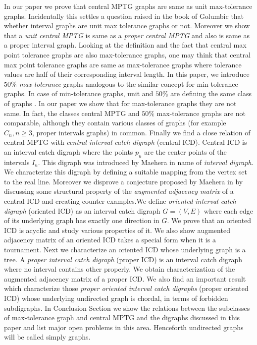 \documentclass{article}
\theoremstyle{definition}
\numberwithin{equation}{section}
\begin{document}
\vspace{0.5em}
\noindent In our paper we prove that central MPTG graphs are same as unit max-tolerance graphs. Incidentally this settles a question raised in the book of Golumbic \cite{Golumbic2} that whether interval graphs are unit max tolerance graphs or not. Moreover we show that a {\em unit central MPTG} is same as a {\em proper central MPTG} and also is same as a proper interval graph. Looking at the definition and the fact that central max point tolerance graphs are also max-tolerance graphs, one may think that central max point tolerance graphs are same as max-tolerance graphs where tolerance values are half of their corresponding interval length. In this paper, we introduce {\em $50\%$ max-tolerance} graphs analogous to the  similar concept for min-tolerance graphs. In case of min-tolerance graphs, unit and $50\%$ are defining the same class of graphs \cite{Bogart}. In our paper we show that for max-tolerance graphs they are not same. In fact, the classes central MPTG and $50\%$ max-tolerance graphs are not comparable, although they contain various classes of graphs (for example $C_{n},n\geq 3$, proper intervals graphs) in common. Finally we find a close relation of central MPTG with  {\em central interval catch digraph} (central ICD). Central ICD is an interval catch digraph where the points $p_{u}$ are the center points of the intervals $I_{u}$. This digraph was introduced by Maehera \cite{Maehera} in name of {\em interval digraph}. We characterize this digraph by defining a suitable mapping from the vertex set to the real line. Moreover we disprove a conjecture proposed by Maehera in \cite{Maehera} by discussing some structural property of the {\em augmented adjacency matrix} of a central ICD and creating counter examples.We define {\em oriented interval catch digraph} (oriented ICD) as an interval catch digraph $G=(V,E)$ where each edge of its underlying graph has exactly one direction in $G$. 
We prove that an oriented ICD is acyclic and study various properties of it. We also show augmented adjacency matrix of an oriented ICD takes a special form when it is a tournament. Next we characterize an oriented ICD whose underlying graph is a tree. A {\em proper interval catch digraph} (proper ICD) is an interval catch digraph where no interval contains other properly. We obtain characterization of the augmented adjacency matrix of a proper ICD. We also find an important result which characterize those {\em proper oriented interval catch digraphs} (proper oriented ICD) whose underlying undirected graph is chordal, in terms of forbidden subdigraphs. In Conclusion Section we show the relations between the subclasses of max-tolerance graph and central MPTG and the digraphs discussed in this paper and list major open problems in this area. Henceforth undirected graphs will be called simply graphs.
\end{document}

